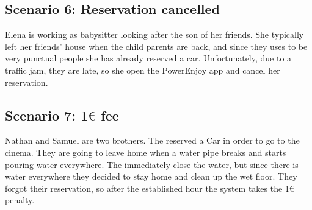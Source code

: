 \subsection{Scenario 6: Reservation cancelled}
Elena is working as babysitter looking after the son of her friends. She typically left her friends' house when the child parents are back, and since they uses to be very punctual people she has already reserved a car. Unfortunately, due to a traffic jam, they are late, so she open the PowerEnjoy app and cancel her reservation.

\subsection{Scenario 7: 1$\euro$ fee}
Nathan and Samuel are two brothers. The reserved a Car in order to go to the cinema. They are going to leave home when a water pipe breaks and starts pouring water everywhere. The immediately close the water, but since there is water everywhere they decided to stay home and clean up the wet floor. They forgot their reservation, so after the established hour the system takes the 1$\euro$ penalty.